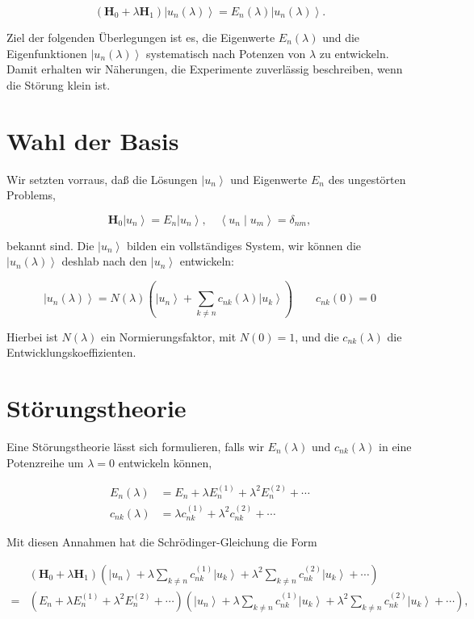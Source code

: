 \documentclass[10pt, letterpaper]{article}
\begin{document}
$$
\left(\mathbf{H}_{0}+\lambda \mathbf{H}_{1}\right)\left|u_{n}(\lambda)\right\rangle=E_{n}(\lambda)\left|u_{n}(\lambda)\right\rangle .
$$

Ziel der folgenden Überlegungen ist es, die Eigenwerte $E_{n}(\lambda)$ und die Eigenfunktionen $\left|u_{n}(\lambda)\right\rangle$ systematisch nach Potenzen von $\lambda$ zu entwickeln. Damit erhalten wir Näherungen, die Experimente zuverlässig beschreiben, wenn die Störung klein ist.

\section*{Wahl der Basis}
Wir setzten vorraus, daß die Lösungen $\left|u_{n}\right\rangle$ und Eigenwerte $E_{n}$ des ungestörten Problems,

$$
\mathbf{H}_{0}\left|u_{n}\right\rangle=E_{n}\left|u_{n}\right\rangle, \quad\left\langle u_{n} \mid u_{m}\right\rangle=\delta_{n m},
$$

bekannt sind. Die $\left|u_{n}\right\rangle$ bilden ein vollständiges System, wir können die $\left|u_{n}(\lambda)\right\rangle$ deshlab nach den $\left|u_{n}\right\rangle$ entwickeln:

$$
\left|u_{n}(\lambda)\right\rangle=N(\lambda)\left(\left|u_{n}\right\rangle+\sum_{k \neq n} c_{n k}(\lambda)\left|u_{k}\right\rangle\right) \quad \quad c_{n k}(0)=0
$$

Hierbei ist $N(\lambda)$ ein Normierungsfaktor, mit $N(0)=1$, und die $c_{n k}(\lambda)$ die Entwicklungskoeffizienten.

\section*{Störungstheorie}
Eine Störungstheorie lässt sich formulieren, falls wir $E_{n}(\lambda)$ und $c_{n k}(\lambda)$ in eine Potenzreihe um $\lambda=0$ entwickeln können,

$$
\begin{aligned}
E_{n}(\lambda) & =E_{n}+\lambda E_{n}^{(1)}+\lambda^{2} E_{n}^{(2)}+\cdots \\
c_{n k}(\lambda) & =\lambda c_{n k}^{(1)}+\lambda^{2} c_{n k}^{(2)}+\cdots
\end{aligned}
$$

Mit diesen Annahmen hat die Schrödinger-Gleichung die Form

$$
\begin{aligned}
& \left(\mathbf{H}_{0}+\lambda \mathbf{H}_{1}\right)\left(\left|u_{n}\right\rangle+\lambda \sum_{k \neq n} c_{n k}^{(1)}\left|u_{k}\right\rangle+\lambda^{2} \sum_{k \neq n} c_{n k}^{(2)}\left|u_{k}\right\rangle+\cdots\right) \\
= & \left(E_{n}+\lambda E_{n}^{(1)}+\lambda^{2} E_{n}^{(2)}+\cdots\right)\left(\left|u_{n}\right\rangle+\lambda \sum_{k \neq n} c_{n k}^{(1)}\left|u_{k}\right\rangle+\lambda^{2} \sum_{k \neq n} c_{n k}^{(2)}\left|u_{k}\right\rangle+\cdots\right),
\end{aligned}
$$
\end{document}
